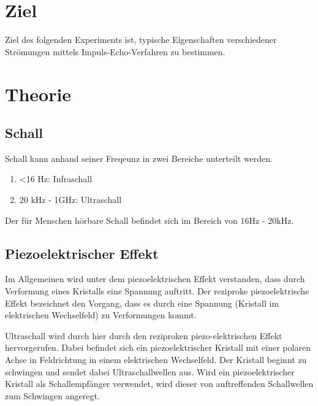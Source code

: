 \section{Ziel}
Ziel des folgenden Experiments ist, typische Eigenschaften verschiedener Strömungen mittels Impuls-Echo-Verfahren zu bestimmen.

\section{Theorie}
\label{sec:theorie}
\subsection{Schall}
Schall kann anhand seiner Freqeunz in zwei Bereiche unterteilt werden.
\begin{enumerate}
  \item <16 \si{\Hz}: Infraschall
  \item 20 \si{\kilo\Hz} - 1\si{\giga\Hz}: Ultraschall
\end{enumerate}
Der für Menschen hörbare Schall befindet sich im Bereich von $16\si{\Hz}$ - $20\si{\kilo\Hz}$.

\subsection{Piezoelektrischer Effekt}
Im Allgemeinen wird unter dem piezoelektrischen Effekt verstanden, dass durch Verformung eines Kristalls eine Spannung auftritt. Der reziproke piezoelektrische Effekt bezeichnet den Vorgang, dass es durch eine Spannung (Kristall im elektrischen Wechselfeld) zu Verformungen kommt.

Ultraschall wird durch hier durch den reziproken piezo-elektrischen Effekt hervorgerufen. Dabei befindet sich ein piezoelektrischer Kristall mit einer polaren Achse in Feldrichtung in einem elektrischen Wechselfeld. Der Kristall beginnt zu schwingen und sendet dabei Ultraschallwellen aus. Wird ein piezoelektrischer Kristall als Schallempfänger verwendet, wird dieser von auftreffenden Schallwellen zum Schwingen angeregt.

